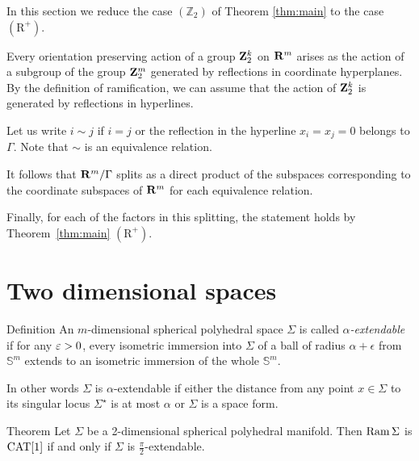 \documentclass{compositio}
\begin{document}
In this section we reduce the case $(\mathbb{Z}_2)$ of Theorem \ref{thm:main} to  the case $(\mathrm{R}^+)$.

Every orientation preserving action of a group $\mathbf{Z}_2^k$ on $\mathbf{R}^m$ arises as
the action of a subgroup of the group $\mathbf{Z}_2^m$ generated by reflections in coordinate  hyperplanes.
By the definition of ramification, 
we can assume that the action of $\mathbf{Z}_2^k$ 
is generated by reflections in hyperlines.

Let us write $i\sim j$ if $i=j$ or  the reflection in
the hyperline $x_i=x_j=0$ belongs to $\Gamma$.
Note that $\sim$ is an equivalence relation.

It follows that $\mathbf{R}^m/\Gamma$ splits as a direct product of the subspaces corresponding to the coordinate subspaces of $\mathbf{R}^m$ for each equivalence relation.

Finally, for each of the factors in this splitting,
the statement holds by Theorem~\ref{thm:main} $(\mathrm{R}^+)$.
\qeds















\section{Two dimensional spaces}\label{ramsphere}

\begin{thm}{Definition} An $m$-dimensional spherical polyhedral space  $\Sigma$ is called \emph{$\alpha$-extendable}
if for any $\varepsilon>0$,
every isometric immersion into $\Sigma$
of a ball of radius $\alpha+\epsilon$
from $\mathbb{S}^m$ extends to an isometric immersion of the whole $\mathbb{S}^m$.

In other words
$\Sigma$ is $\alpha$-extendable if
either
the distance from any point $x\in \Sigma$
to its singular locus $\Sigma^{{\star}}$ is at most $\alpha$
or $\Sigma$ is a space form.
\end{thm}

\begin{thm}{Theorem}\label{thm:2D-sphere}
Let $\Sigma$ be a 2-dimensional spherical polyhedral manifold.
 Then $\mathop{\rm Ram}\nolimits\Sigma$ is $\mathrm{CAT}[1]$ if and only if $\Sigma$ is $\frac{\pi}{2}$-extendable.
\end{thm}
\end{document}
